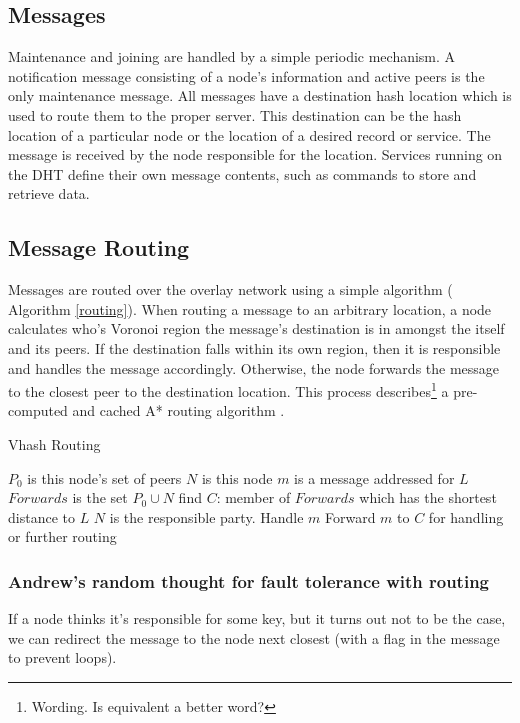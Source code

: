 \documentclass{IEEEtran}
\begin{document}
\subsection{Messages}
Maintenance and joining are handled by a simple periodic mechanism. A notification message consisting of a node's information and active peers is the only maintenance message. All messages have a destination hash location which is used to route them to the proper server. This destination can be the hash location of a particular node or the location of a desired record or service.  The message is received by the node responsible for the location. Services running on the DHT define their own message contents, such as commands to store and retrieve data.

\subsection{Message Routing}
Messages are routed over the overlay network using a simple algorithm ( Algorithm \ref{routing}). 
When routing a message to an arbitrary location, a node calculates who's Voronoi region the message's destination is in amongst the itself and its peers. If the destination falls within its own region, then it is responsible and handles the message accordingly. Otherwise, the node forwards the message to the closest peer to the destination location. This process describes\footnote{Wording.  Is equivalent a better word?} a pre-computed and cached A* routing  algorithm \cite{astar} . 

\begin{algorithm}
\caption{Vhash Routing}
\label{routing}
\begin{algorithmic}[1]  %
	\STATE $P_0$ is this node's set of peers
    \STATE $N$ is this node
	\STATE $m$ is a message addressed for $L$
    \STATE $Forwards$ is the set $P_0\cup{}N$
    \STATE find $C$: member of $Forwards$ which has the shortest distance to $L$
    	\STATE $N$ is the responsible party.
        \STATE Handle $m$
    \ELSE
    	\STATE Forward $m$ to $C$ for handling or further routing
    \ENDIF
\end{algorithmic}
\end{algorithm}

\subsubsection{Andrew's random thought for fault tolerance with routing}
If a node thinks it's responsible for some key, but it turns out not to be the case,  we can redirect the message to the node next closest (with a flag in the message to prevent loops). 
\end{document}
